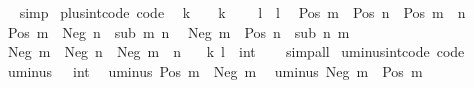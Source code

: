 \begin{isabellebody}
%
\isadelimproof
\ \ %
\endisadelimproof
%
\isatagproof
{}\isamarkupfalse%
\ simp%
\endisatagproof
{\isafoldproof}%
%
\isadelimproof
\isanewline
%
\endisadelimproof
\isanewline
{}\isamarkupfalse%
\ plus{\isacharunderscore}{\kern0pt}int{\isacharunderscore}{\kern0pt}code\ {\isacharbrackleft}{\kern0pt}code{\isacharbrackright}{\kern0pt}{\isacharcolon}{\kern0pt}\isanewline
\ \ {\isachardoublequoteopen}k\ {\isacharplus}{\kern0pt}\ {}\ {\isacharequal}{\kern0pt}\ k{\isachardoublequoteclose}\isanewline
\ \ {\isachardoublequoteopen}{}\ {\isacharplus}{\kern0pt}\ l\ {\isacharequal}{\kern0pt}\ l{\isachardoublequoteclose}\isanewline
\ \ {\isachardoublequoteopen}Pos\ m\ {\isacharplus}{\kern0pt}\ Pos\ n\ {\isacharequal}{\kern0pt}\ Pos\ {\isacharparenleft}{\kern0pt}m\ {\isacharplus}{\kern0pt}\ n{\isacharparenright}{\kern0pt}{\isachardoublequoteclose}\isanewline
\ \ {\isachardoublequoteopen}Pos\ m\ {\isacharplus}{\kern0pt}\ Neg\ n\ {\isacharequal}{\kern0pt}\ sub\ m\ n{\isachardoublequoteclose}\isanewline
\ \ {\isachardoublequoteopen}Neg\ m\ {\isacharplus}{\kern0pt}\ Pos\ n\ {\isacharequal}{\kern0pt}\ sub\ n\ m{\isachardoublequoteclose}\isanewline
\ \ {\isachardoublequoteopen}Neg\ m\ {\isacharplus}{\kern0pt}\ Neg\ n\ {\isacharequal}{\kern0pt}\ Neg\ {\isacharparenleft}{\kern0pt}m\ {\isacharplus}{\kern0pt}\ n{\isacharparenright}{\kern0pt}{\isachardoublequoteclose}\isanewline
\ \ \ k\ l\ {\isacharcolon}{\kern0pt}{\isacharcolon}{\kern0pt}\ int\isanewline
%
\isadelimproof
\ \ %
\endisadelimproof
%
\isatagproof
{}\isamarkupfalse%
\ simp{\isacharunderscore}{\kern0pt}all%
\endisatagproof
{\isafoldproof}%
%
\isadelimproof
\isanewline
%
\endisadelimproof
\isanewline
{}\isamarkupfalse%
\ uminus{\isacharunderscore}{\kern0pt}int{\isacharunderscore}{\kern0pt}code\ {\isacharbrackleft}{\kern0pt}code{\isacharbrackright}{\kern0pt}{\isacharcolon}{\kern0pt}\isanewline
\ \ {\isachardoublequoteopen}uminus\ {}\ {\isacharequal}{\kern0pt}\ {\isacharparenleft}{\kern0pt}{}{\isacharcolon}{\kern0pt}{\isacharcolon}{\kern0pt}int{\isacharparenright}{\kern0pt}{\isachardoublequoteclose}\isanewline
\ \ {\isachardoublequoteopen}uminus\ {\isacharparenleft}{\kern0pt}Pos\ m{\isacharparenright}{\kern0pt}\ {\isacharequal}{\kern0pt}\ Neg\ m{\isachardoublequoteclose}\isanewline
\ \ {\isachardoublequoteopen}uminus\ {\isacharparenleft}{\kern0pt}Neg\ m{\isacharparenright}{\kern0pt}\ {\isacharequal}{\kern0pt}\ Pos\ m{\isachardoublequoteclose}\isanewline
%
\isadelimproof
\ \ %
\endisadelimproof
%
\isatagproof

\end{isabellebody}
